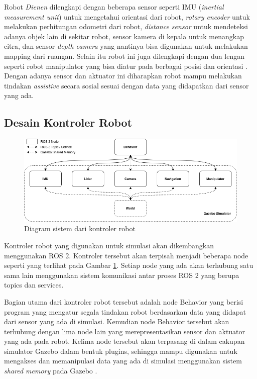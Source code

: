 Robot \emph{Dienen} dilengkapi dengan beberapa sensor seperti IMU (\emph{inertial measurement unit}) untuk mengetahui orientasi dari robot, \emph{rotary encoder} untuk melakukan perhitungan odometri dari robot, \emph{distance sensor} untuk mendeteksi adanya objek lain di sekitar robot, sensor kamera di kepala untuk menangkap citra, dan sensor \emph{depth camera} yang nantinya bisa digunakan untuk melakukan mapping dari ruangan.
Selain itu robot ini juga dilengkapi dengan dua lengan seperti robot manipulator yang bisa diatur pada berbagai posisi dan orientasi \citep{iqbal2012}.
Dengan adanya sensor dan aktuator ini diharapkan robot mampu melakukan tindakan \emph{assistive} secara sosial sesuai dengan data yang didapatkan dari sensor yang ada.

\subsection{Desain Kontroler Robot}

\begin{figure} [ht]
  \centering
  \includegraphics[scale=0.5]{gambar/kontrolerrobot.png}
  \caption{Diagram sistem dari kontroler robot}
  \label{fig:kontrolerrobot}
\end{figure}

Kontroler robot yang digunakan untuk simulasi akan dikembangkan menggunakan ROS 2.
Kontroler tersebut akan terpisah menjadi beberapa node seperti yang terlihat pada Gambar \ref{fig:kontrolerrobot}.
Setiap node yang ada akan terhubung satu sama lain menggunakan sistem komunikasi antar proses ROS 2 yang berupa topics dan services.

Bagian utama dari kontroler robot tersebut adalah node Behavior yang berisi program yang mengatur segala tindakan robot berdasarkan data yang didapat dari sensor yang ada di simulasi.
Kemudian node Behavior tersebut akan terhubung dengan lima node lain yang merepresentasikan sensor dan aktuator yang ada pada robot.
Kelima node tersebut akan terpasang di dalam cakupan simulator Gazebo dalam bentuk plugins, sehingga mampu digunakan untuk mengakses dan memanipulasi data yang ada di simulasi menggunakan sistem \emph{shared memory} pada Gazebo \citep{gazeboplugins}.

